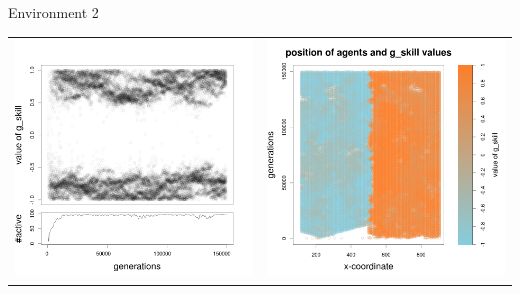 \documentclass[8pt, handout=show,notes=show]{beamer}
\begin{document}
\begin{frame}{Environment 2}
\begin{table}[H]
\begin{tabular}{cc}
\newline
\includegraphics[width=\imgSize]{../images/5StaticEnv/Gplot66_staticEnv2}&\includegraphics[width=\imgSize]{../images/5StaticEnv/Gplot66Static_staticEnv2}\\
\end{tabular}

\end{table}
\end{frame}
\end{document}
